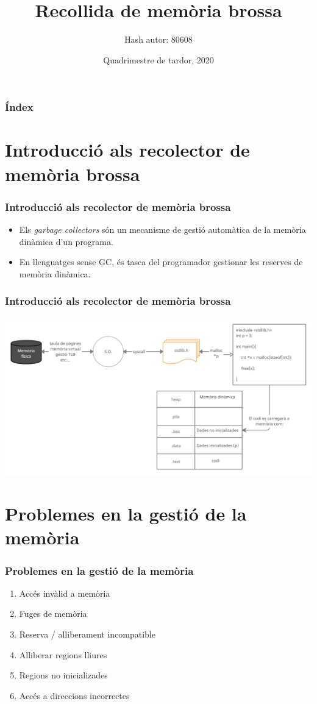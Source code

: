 \documentclass{beamer}
\title{\textbf{Recollida de memòria brossa}}
\author{Hash autor: 80608}
\institute[]{Facultat d'Informàtica de Barcelona - UPC\\Llenguatges de programació}
\date{Quadrimestre de tardor, 2020}
\newcommand{\newSectionFrame}[1]{\section{#1} \begin{frame}\frametitle{#1}}
\newcommand{\nextSectionFrame}[1]{\begin{frame}\frametitle{#1}}
\begin{document}
    
    \frame{\titlepage}
    \begin{frame}
        \frametitle{Índex}
        \tableofcontents
    \end{frame}
    
    \newSectionFrame{Introducció als recolector de memòria brossa}
        \begin{itemize}
            \item Els \textit{garbage collectors} són un mecanisme de gestió automàtica de la memòria dinàmica d'un programa.
            \item En llenguatges sense GC, és tasca del programador gestionar les reserves de memòria dinàmica.
        \end{itemize}
    \end{frame}

    \nextSectionFrame{Introducció als recolector de memòria brossa}
        \includegraphics[width=\textwidth]{c_std_memory.png}        
    \end{frame}

    \newSectionFrame{Problemes en la gestió de la memòria}
        \begin{enumerate}
            \item Accés invàlid a memòria
            \item Fuges de memòria
            \item Reserva / alliberament incompatible
            \item Alliberar regions lliures
            \item Regions no inicializades
            \item Accés a direccions incorrectes
        \end{enumerate}
    \end{frame}
\end{document}
